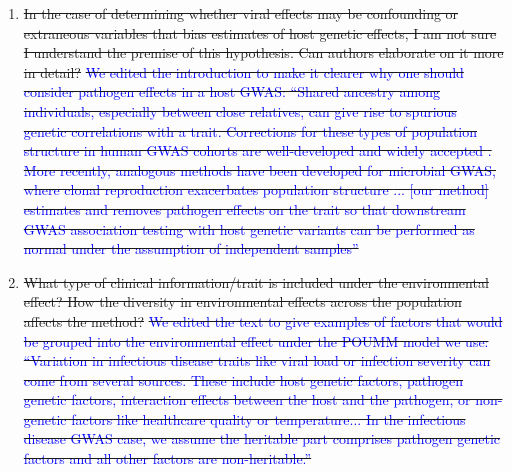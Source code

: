 \documentclass[12pt]{article} %
\providecommand{\DIFdel}[1]{{\protect\color{red}\sout{#1}}}                      %
\begin{document}
\begin{enumerate}
{    }%
\item%
\DIFdel{In the case of determining whether viral effects may be confounding or extraneous variables that bias estimates of host genetic effects, I am not sure I understand the premise of this hypothesis. Can authors elaborate on it more in detail? }%
\DIFdel{\textcolor{blue}{We edited the introduction to make it clearer why one should consider pathogen effects in a host GWAS: ``Shared ancestry among individuals, especially between close relatives, can give rise to spurious genetic correlations with a trait. Corrections for these types of population structure in human GWAS cohorts are well-developed and widely accepted  \citep{Astle2009, Price2006}. More recently, analogous methods have been developed for microbial GWAS, where clonal reproduction exacerbates population structure \citep{Power2017}... [our method] estimates and removes pathogen effects on the trait so that downstream GWAS association testing with host genetic variants can be performed as normal under the assumption of independent samples''}
    }%
\item%
\DIFdel{What type of clinical information/trait is included under the environmental effect? How the diversity in environmental effects across the population affects the method? }%
\DIFdel{\textcolor{blue}{We edited the text to give examples of factors that would be grouped into the environmental effect under the POUMM model we use: ``Variation in infectious disease traits like viral load or infection severity can come from several sources. These include host genetic factors, pathogen genetic factors, interaction effects between the host and the pathogen, or non-genetic factors like healthcare quality or temperature... In the infectious disease GWAS case, we assume the heritable part comprises pathogen genetic factors and all other factors are non-heritable.''}
    }%


\end{enumerate}
\end{document}
